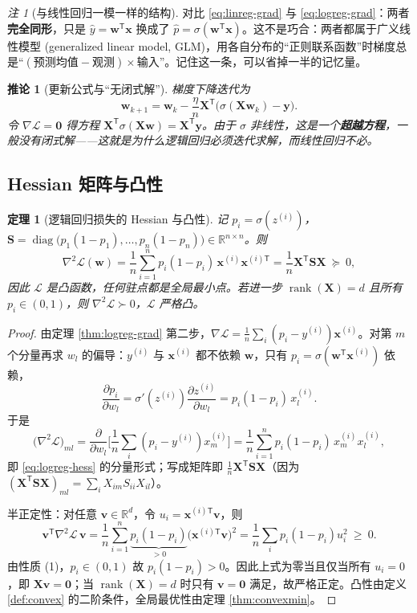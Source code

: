 \documentclass[UTF8,a4paper,11pt]{ctexart}
\theoremstyle{definition}
\theoremstyle{plain}
\newtheorem{theorem}[definition]{定理}
\newtheorem{corollary}[definition]{推论}
\theoremstyle{remark}
\newtheorem{remark}[definition]{注}
\DeclareMathOperator{\rank}{rank}
\DeclareMathOperator{\diag}{diag}
\newcommand{\R}{\mathbb{R}}
\newcommand{\Loss}{\mathcal{L}}
\newcommand{\T}{^{\mathsf{T}}}
\newcommand{\eng}[1]{\textup{(#1)}}
\begin{document}
\begin{remark}[与线性回归一模一样的结构]
对比 \eqref{eq:linreg-grad} 与 \eqref{eq:logreg-grad}：两者\textbf{完全同形}，只是 $\hat y=\bm{w}\T\bm{x}$ 换成了 $\hat p=\sigma(\bm{w}\T\bm{x})$。这不是巧合：两者都属于广义线性模型 \eng{generalized linear model, GLM}，用各自分布的“正则联系函数”时梯度总是“$(\text{预测均值}-\text{观测})\times\text{输入}$”。记住这一条，可以省掉一半的记忆量。
\end{remark}

\begin{corollary}[更新公式与“无闭式解”]
梯度下降迭代为
\[
  \bm{w}_{k+1}=\bm{w}_k-\frac{\eta}{n}\bm{X}\T\big(\sigma(\bm{X}\bm{w}_k)-\bm{y}\big).
\]
令 $\nabla\Loss=\bm{0}$ 得方程 $\bm{X}\T\sigma(\bm{X}\bm{w})=\bm{X}\T\bm{y}$。由于 $\sigma$ 非线性，这是一个\textbf{超越方程}，一般没有闭式解——这就是为什么逻辑回归必须迭代求解，而线性回归不必。
\end{corollary}

\subsection{Hessian 矩阵与凸性}

\begin{theorem}[逻辑回归损失的 Hessian 与凸性]\label{thm:logreg-hess}
记 $p_i=\sigma(z^{(i)})$，$\bm{S}=\diag\big(p_1(1-p_1),\dots,p_n(1-p_n)\big)\in\R^{n\times n}$。则
\begin{equation}\label{eq:logreg-hess}
  \nabla^2\Loss(\bm{w})=\frac1n\sum_{i=1}^{n}p_i(1-p_i)\,\bm{x}^{(i)}\bm{x}^{(i)\mathsf{T}}
  =\frac1n\bm{X}\T\bm{S}\bm{X}\ \succeq\ 0 ,
\end{equation}
因此 $\Loss$ 是凸函数，任何驻点都是全局最小点。若进一步 $\rank(\bm{X})=d$ 且所有 $p_i\in(0,1)$，则 $\nabla^2\Loss\succ0$，$\Loss$ 严格凸。
\end{theorem}

\begin{proof}
由定理 \ref{thm:logreg-grad} 第二步，$\nabla\Loss=\frac1n\sum_i(p_i-y^{(i)})\bm{x}^{(i)}$。对第 $m$ 个分量再求 $w_l$ 的偏导：$y^{(i)}$ 与 $\bm{x}^{(i)}$ 都不依赖 $\bm{w}$，只有 $p_i=\sigma(\bm{w}\T\bm{x}^{(i)})$ 依赖，
\[
  \frac{\partial p_i}{\partial w_l}=\sigma'(z^{(i)})\frac{\partial z^{(i)}}{\partial w_l}=p_i(1-p_i)\,x^{(i)}_l .
\]
于是
\[
  \big(\nabla^2\Loss\big)_{ml}=\frac{\partial}{\partial w_l}\Big[\frac1n\sum_i(p_i-y^{(i)})x^{(i)}_m\Big]
  =\frac1n\sum_{i=1}^{n}p_i(1-p_i)\,x^{(i)}_m x^{(i)}_l ,
\]
即 \eqref{eq:logreg-hess} 的分量形式；写成矩阵即 $\frac1n\bm{X}\T\bm{S}\bm{X}$（因为 $(\bm{X}\T\bm{S}\bm{X})_{ml}=\sum_i X_{im}S_{ii}X_{il}$）。

半正定性：对任意 $\bm{v}\in\R^d$，令 $u_i=\bm{x}^{(i)\mathsf{T}}\bm{v}$，则
\[
  \bm{v}\T\nabla^2\Loss\,\bm{v}=\frac1n\sum_{i=1}^{n}\underbrace{p_i(1-p_i)}_{>0}\big(\bm{x}^{(i)\mathsf{T}}\bm{v}\big)^2
  =\frac1n\sum_i p_i(1-p_i)u_i^2\ \ge\ 0 .
\]
由性质 (1)，$p_i\in(0,1)$ 故 $p_i(1-p_i)>0$。因此上式为零当且仅当所有 $u_i=0$，即 $\bm{X}\bm{v}=\bm{0}$；当 $\rank(\bm{X})=d$ 时只有 $\bm{v}=\bm{0}$ 满足，故严格正定。凸性由定义 \ref{def:convex} 的二阶条件，全局最优性由定理 \ref{thm:convexmin}。
\end{proof}
\end{document}
